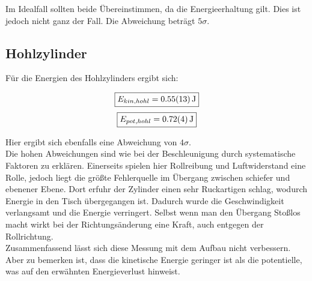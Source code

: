 Im Idealfall sollten beide Übereinstimmen, da die Energieerhaltung gilt. Dies ist jedoch nicht ganz der Fall.
Die Abweichung beträgt $5 \sigma$.

\subsection{Hohlzylinder}

Für die Energien des Hohlzylinders ergibt sich:

\[\boxed{E_{kin,hohl} = \SI{0,55 \pm 0,13}{\joule}}\]
\[\boxed{E_{pot,hohl} = \SI{0,72 \pm 0,04}{\joule}}\]

Hier ergibt sich ebenfalls eine Abweichung von $4 \sigma$.\\

Die hohen Abweichungen sind wie bei der Beschleunigung durch systematische Faktoren zu erklären.
Einerseits spielen hier Rollreibung und Luftwiderstand eine Rolle, jedoch liegt die größte Fehlerquelle im Übergang zwischen schiefer und ebenener Ebene.
Dort erfuhr der Zylinder einen sehr Ruckartigen schlag, wodurch Energie in den Tisch übergegangen ist. Dadurch wurde die Geschwindigkeit verlangsamt und die Energie verringert.
Selbst wenn man den Übergang Stoßlos macht wirkt bei der Richtungsänderung eine Kraft, auch entgegen der Rollrichtung.\\
Zusammenfassend lässt sich diese Messung mit dem Aufbau nicht verbessern. Aber zu bemerken ist, dass die kinetische Energie geringer ist als die potentielle, was auf den erwähnten Energieverlust hinweist.